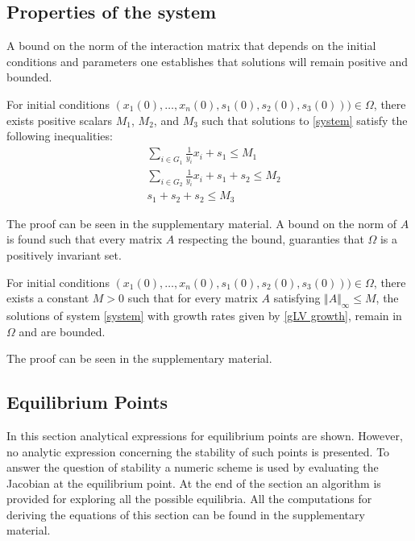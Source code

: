 \documentclass[processes,article,submit,moreauthors,pdftex]{Definitions/mdpi}
\begin{document}
\subsection{Properties of the system}
\label{Properties_of_the_system}

A bound on the norm of the interaction matrix that depends on the initial conditions and parameters one establishes that solutions will remain positive and bounded. 

\begin{Lemma}
	\label{l1}
	For initial conditions $(x_1(0),\dots,x_n(0),s_1(0),s_2(0),s_3(0)))\in \Omega$, there exists positive scalars $M_1$, $M_2$, and $M_3$ such that solutions to \eqref{system} satisfy the following inequalities:
	\begin{align}
	&\sum \limits_{i \in G_1} \frac{1}{y_i}x_i + s_1 \leq M_1 \\
	&\sum \limits_{i \in G_2} \frac{1}{y_i}x_i + s_1 +s_2 \leq M_2 \\
	&s_1 + s_2 + s_2 \leq M_3
	\end{align}
\end{Lemma}

The proof can be seen in the supplementary material. A bound on the norm of $A$ is found such that every matrix $A$ respecting the bound, guaranties that $\Omega$ is a positively invariant set.

\begin{Lemma}
	\label{theoWellPosedness}
	For initial conditions $(x_1(0),\dots,x_n(0),s_1(0),s_2(0),s_3(0)))\in \Omega$, there exists a constant $M>0$ such that for every matrix $A$ satisfying $\Vert A \Vert_{\infty} \leq M $, the solutions of system \eqref{system} with growth rates given by \eqref{gLV growth}, remain in $\Omega$ and are bounded.
\end{Lemma}

The proof can be seen in the supplementary material.

\subsection{Equilibrium Points}

In this section analytical expressions for equilibrium points are shown. However, no analytic expression concerning the stability of such points is presented. To answer the question of stability a numeric scheme is used by evaluating the Jacobian at the equilibrium point. At the end of the section an algorithm is provided for exploring all the possible equilibria. All the computations for deriving the equations of this section can be found in the supplementary material.
\end{document}

